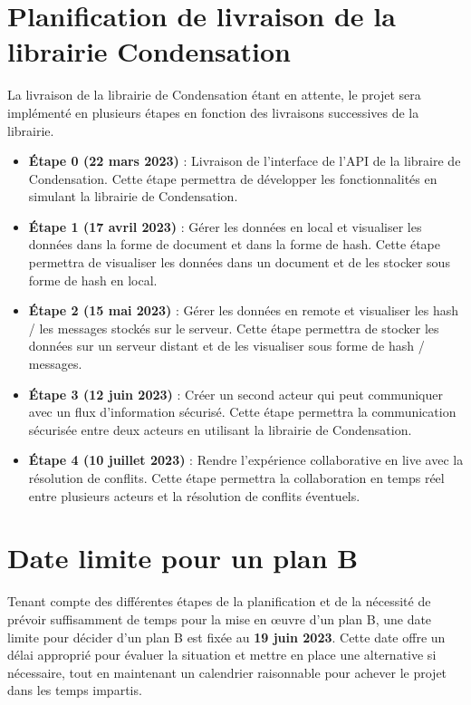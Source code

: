 \section*{Planification de livraison de la librairie Condensation}
La livraison de la librairie de Condensation étant en attente, le projet sera implémenté en plusieurs étapes en fonction des livraisons successives de la librairie.
\begin{itemize}
    \item \textbf{Étape 0 (22 mars 2023)} : Livraison de l'interface de l'API de la libraire de Condensation. Cette étape permettra de développer les fonctionnalités en simulant la librairie de Condensation.
    \item \textbf{Étape 1 (17 avril 2023)} : Gérer les données en local et visualiser les données dans la forme de document et dans la forme de hash. Cette étape permettra de visualiser les données dans un document et de les stocker sous forme de hash en local.
    \item \textbf{Étape 2 (15 mai 2023)} : Gérer les données en remote et visualiser les hash / les messages stockés sur le serveur. Cette étape permettra de stocker les données sur un serveur distant et de les visualiser sous forme de hash / messages.
    \item \textbf{Étape 3 (12 juin 2023)} : Créer un second acteur qui peut communiquer avec un flux d'information sécurisé. Cette étape permettra la communication sécurisée entre deux acteurs en utilisant la librairie de Condensation.
    \item \textbf{Étape 4 (10 juillet 2023)} : Rendre l'expérience collaborative en live avec la résolution de conflits. Cette étape permettra la collaboration en temps réel entre plusieurs acteurs et la résolution de conflits éventuels.
\end{itemize}

\section*{Date limite pour un plan B}
Tenant compte des différentes étapes de la planification et de la nécessité de
prévoir suffisamment de temps pour la mise en \oe{}uvre d'un plan B, une date limite
pour décider d'un plan B est fixée au \textbf{19 juin 2023}. Cette date offre un
délai approprié pour évaluer la situation et mettre en place une alternative si
nécessaire, tout en maintenant un calendrier raisonnable pour achever le projet
dans les temps impartis.


